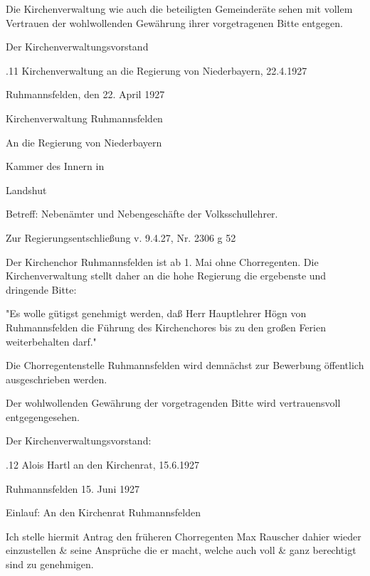 \documentclass[12pt,a4paper]{book}
\begin{document}
Die Kirchenverwaltung wie auch die beteiligten Gemeinderäte sehen mit vollem
Vertrauen der wohlwollenden Gewährung ihrer vorgetragenen Bitte entgegen.



Der Kirchenverwaltungsvorstand

.11 Kirchenverwaltung an die Regierung von Niederbayern, 22.4.1927

Ruhmannsfelden, den 22. April 1927

Kirchenverwaltung Ruhmannsfelden



An die Regierung von Niederbayern

Kammer des Innern in

Landshut



Betreff: Nebenämter und Nebengeschäfte der Volksschullehrer.



Zur Regierungsentschließung v. 9.4.27, Nr. 2306 g 52



Der Kirchenchor Ruhmannsfelden ist ab 1. Mai ohne Chorregenten. Die
Kirchenverwaltung stellt daher an die hohe Regierung die ergebenste und
dringende Bitte:

"Es wolle gütigst genehmigt werden, daß Herr Hauptlehrer Högn von Ruhmannsfelden
die Führung des Kirchenchores bis zu den großen Ferien weiterbehalten darf."



Die Chorregentenstelle Ruhmannsfelden wird demnächst zur Bewerbung öffentlich
ausgeschrieben werden.

Der wohlwollenden Gewährung der vorgetragenden Bitte wird vertrauensvoll
entgegengesehen.



Der Kirchenverwaltungsvorstand:

.12 Alois Hartl an den Kirchenrat, 15.6.1927

Ruhmannsfelden 15. Juni 1927



Einlauf: An den Kirchenrat Ruhmannsfelden



Ich stelle hiermit Antrag den früheren Chorregenten Max Rauscher dahier wieder
einzustellen & seine Ansprüche die er macht, welche auch voll & ganz berechtigt
sind zu genehmigen.
\end{document}
